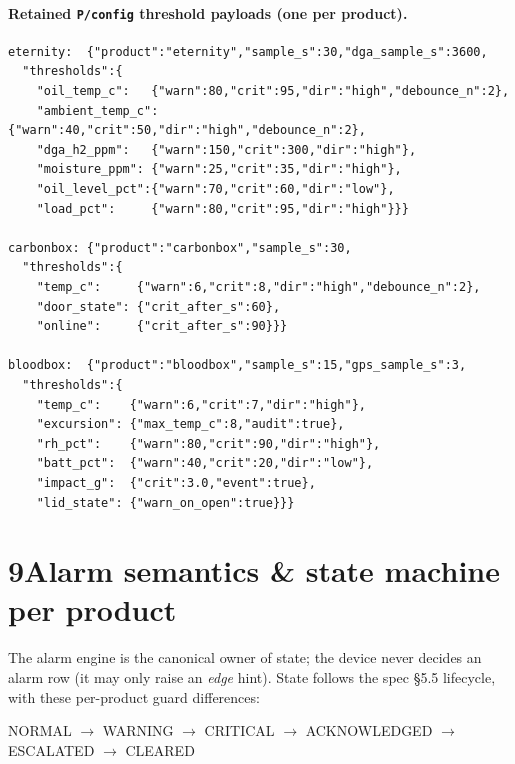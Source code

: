 \documentclass[11pt,a4paper]{article}
\begin{document}
\paragraph{Retained \texttt{P/config} threshold payloads (one per product).}
\small
\begin{verbatim}
eternity:  {"product":"eternity","sample_s":30,"dga_sample_s":3600,
  "thresholds":{
    "oil_temp_c":   {"warn":80,"crit":95,"dir":"high","debounce_n":2},
    "ambient_temp_c":{"warn":40,"crit":50,"dir":"high","debounce_n":2},
    "dga_h2_ppm":   {"warn":150,"crit":300,"dir":"high"},
    "moisture_ppm": {"warn":25,"crit":35,"dir":"high"},
    "oil_level_pct":{"warn":70,"crit":60,"dir":"low"},
    "load_pct":     {"warn":80,"crit":95,"dir":"high"}}}

carbonbox: {"product":"carbonbox","sample_s":30,
  "thresholds":{
    "temp_c":     {"warn":6,"crit":8,"dir":"high","debounce_n":2},
    "door_state": {"crit_after_s":60},
    "online":     {"crit_after_s":90}}}

bloodbox:  {"product":"bloodbox","sample_s":15,"gps_sample_s":3,
  "thresholds":{
    "temp_c":    {"warn":6,"crit":7,"dir":"high"},
    "excursion": {"max_temp_c":8,"audit":true},
    "rh_pct":    {"warn":80,"crit":90,"dir":"high"},
    "batt_pct":  {"warn":40,"crit":20,"dir":"low"},
    "impact_g":  {"crit":3.0,"event":true},
    "lid_state": {"warn_on_open":true}}}
\end{verbatim}
\normalsize

\newpage
\section*{9\quad Alarm semantics \& state machine per product}
The alarm engine is the canonical owner of state; the device never decides an alarm row (it may
only raise an \emph{edge} hint). State follows the spec \S5.5 lifecycle, with these
per-product guard differences:
\begin{center}
NORMAL $\to$ WARNING $\to$ CRITICAL $\to$ ACKNOWLEDGED $\to$ ESCALATED $\to$ CLEARED
\end{center}
\end{document}
